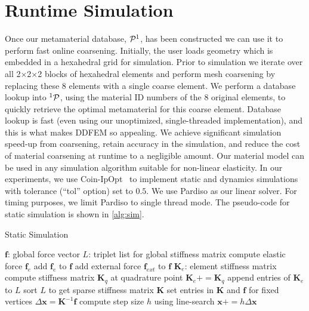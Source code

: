 \section{Runtime Simulation}
\label{sec:runtime}
Once our metamaterial database, $\mathcal{P}^1$, has been constructed we can use it to perform fast online coarsening. 
Initially, the user loads geometry which is embedded in a hexahedral grid for simulation. Prior to simulation we iterate over all 2$\times$2$\times$2 blocks of hexahedral elements and perform mesh coarsening by replacing these 8 elements with a single coarse element. We perform a database lookup into $^1\mathcal{P}$, using the material ID numbers of the 8 original elements, to quickly retrieve the optimal metamaterial for this coarse element. Database lookup is fast (even using our unoptimized, single-threaded implementation), and this is what makes DDFEM so appealing.
We achieve significant simulation speed-up from coarsening, retain accuracy in the simulation, and reduce the cost of material coarsening at runtime to a negligible amount.
	Our material model can be used in any simulation algorithm suitable for non-linear elasticity. In our experiments, we use Coin-IpOpt~\cite{ipopt} to implement static and dynamics simulations with tolerance (``tol'' option) set to $0.5$. We use Pardiso as our linear solver.
	For timing purposes, we limit Pardiso to single thread mode.
	The pseudo-code for static simulation is shown in \autoref{alg:sim}.
\begin{algorithm}[!h]
	
	\caption{Static Simulation}\label{alg:sim}
	\begin{algorithmic}[1]
		\REPEAT
		\STATE $\mathbf{f}$: global force vector
		\STATE $L$: triplet list for global stiffness matrix
		\STATE compute elastic force $\mathbf{f}_e$
		\STATE add $\mathbf{f}_e$ to $\mathbf{f}$
		\ENDFOR
		\STATE add external force $\mathbf{f}_{ext}$ to $\mathbf{f}$
		\STATE $\mathbf{K}_e$: element stiffness matrix
		\STATE compute stiffness matrix $\mathbf{K}_q$ at quadrature point
		\STATE $\mathbf{K}_e+=\mathbf{K}_q$
		\ENDFOR
		\STATE append entries of $\mathbf{K}_e$ to $L$
		\ENDFOR
		\STATE sort $L$ to get sparse stiffness matrix $\mathbf{K}$
		\STATE set entries in $\mathbf{K}$ and $\mathbf{f}$ for fixed vertices
		\STATE $\Delta\mathbf{x}=\mathbf{K}^{-1}\mathbf{f}$
		\STATE compute step size $h$ using line-search
		\STATE $\mathbf{x}+=h\Delta\mathbf{x}$
	\end{algorithmic}
\end{algorithm}